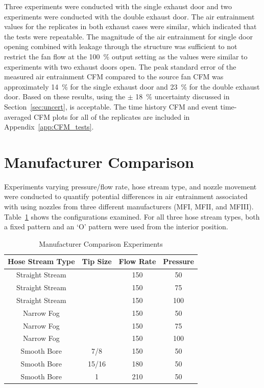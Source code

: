 \documentclass[12pt,oneside]{book}
\begin{document}
Three experiments were conducted with the single exhaust door and two experiments were conducted with the double exhaust door. The air entrainment values for the replicates in both exhaust cases were similar, which indicated that the tests were repeatable. The magnitude of the air entrainment for single door opening combined with leakage through the structure was sufficient to not restrict the fan flow at the 100~\% output setting as the values were similar to experiments with two exhaust doors open. The peak standard error of the measured air entrainment CFM compared to the source fan CFM was approximately 14~\% for the single exhaust door and 23~\% for the double exhaust door. Based on these results, using the $\pm$ 18~\% uncertainty discussed in Section~\ref{sec:uncert}, is acceptable. The time history CFM and event time-averaged CFM plots for all of the replicates are included in Appendix~\ref{app:CFM_tests}.

\section{Manufacturer Comparison}
\label{sec:manu}

Experiments varying pressure/flow rate, hose stream type, and nozzle movement were conducted to quantify potential differences in air entrainment associated with using nozzles from three different manufacturers (MFI, MFII, and MFIII). Table~\ref{tab:Manufacturer_Comparison_Experiments} shows the configurations examined. For all three hose stream types, both a fixed pattern and an `O' pattern were used from the interior position.

\begin{table}[!ht]
\centering
\caption{Manufacturer Comparison Experiments}
\label{tab:Manufacturer_Comparison_Experiments}
\begin{tabular}{cccc}
\toprule[1.5pt]
Hose Stream Type & Tip Size & Flow Rate & Pressure \\ 
\midrule
Straight Stream &       & 150 & 50 \\
Straight Stream &       & 150 & 75 \\
Straight Stream &       & 150 & 100 \\
Narrow Fog      &       & 150 & 50 \\
Narrow Fog      &       & 150 & 75 \\
Narrow Fog      &       & 150 & 100 \\
Smooth Bore     & 7/8   & 150 & 50 \\
Smooth Bore     & 15/16 & 180 & 50 \\
Smooth Bore     & 1     & 210 & 50 \\
\bottomrule[1.25pt]
\end{tabular}
\end{table}
\end{document}
